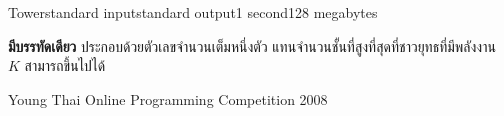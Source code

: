 \documentclass[11pt,a4paper]{article}
\begin{document}
\begin{problem}{Tower}{standard input}{standard output}{1 second}{128 megabytes}
\OutputFile

\textbf{มีบรรทัดเดียว} ประกอบด้วยตัวเลขจำนวนเต็มหนึ่งตัว แทนจำนวนชั้นที่สูงที่สุดที่ชาวยุทธที่มีพลังงาน $K$ สามารถขึ้นไปได้

\Examples

\begin{example}
%
\end{example}


\Source

Young Thai Online Programming Competition 2008

\end{problem}
\end{document}
